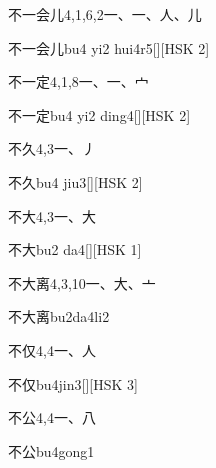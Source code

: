 \begin{entry}{不一会儿}{4,1,6,2}{⼀、⼀、⼈、⼉}
  \begin{phonetics}{不一会儿}{bu4 yi2 hui4r5}[][HSK 2]
  \end{phonetics}
\end{entry}

\begin{entry}{不一定}{4,1,8}{⼀、⼀、⼧}
  \begin{phonetics}{不一定}{bu4 yi2 ding4}[][HSK 2]
  \end{phonetics}
\end{entry}

\begin{entry}{不久}{4,3}{⼀、⼃}
  \begin{phonetics}{不久}{bu4 jiu3}[][HSK 2]
  \end{phonetics}
\end{entry}

\begin{entry}{不大}{4,3}{⼀、⼤}
  \begin{phonetics}{不大}{bu2 da4}[][HSK 1]
  \end{phonetics}
\end{entry}

\begin{entry}{不大离}{4,3,10}{⼀、⼤、⼇}
  \begin{phonetics}{不大离}{bu2da4li2}
  \end{phonetics}
\end{entry}

\begin{entry}{不仅}{4,4}{⼀、⼈}
  \begin{phonetics}{不仅}{bu4jin3}[][HSK 3]
  \end{phonetics}
\end{entry}

\begin{entry}{不公}{4,4}{⼀、⼋}
  \begin{phonetics}{不公}{bu4gong1}
  \end{phonetics}
\end{entry}

